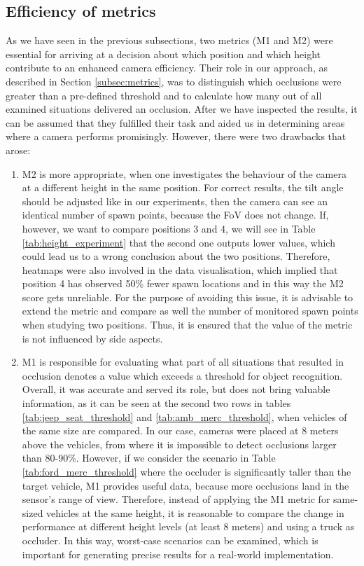 \subsection{Efficiency of metrics}
As we have seen in the previous subsections, two metrics (M1 and M2) were essential for arriving at a decision about which position and which height contribute to an enhanced camera efficiency. Their role in our approach, as described in Section \ref{subsec:metrics}, was to distinguish which occlusions were greater than a pre-defined threshold and to calculate how many out of all examined situations delivered an occlusion. After we have inspected the results, it can be assumed that they fulfilled their task and aided us in determining areas where a camera performs promisingly. However, there were two drawbacks that arose:
\begin{enumerate}
    \item M2 is more appropriate, when one investigates the behaviour of the camera at a different height in the same position. For correct results, the tilt angle should be adjusted like in our experiments, then the camera can see an identical number of spawn points, because the FoV does not change. If, however, we want to compare positions 3 and 4, we will see in Table \ref{tab:height_experiment} that the second one outputs lower values, which could lead us to a wrong conclusion about the two positions. Therefore, heatmaps were also involved in the data visualisation, which implied that position 4 has observed 50\% fewer spawn locations and in this way the M2 score gets unreliable. For the purpose of avoiding this issue, it is advisable to extend the metric and compare as well the number of monitored spawn points when studying two positions. Thus, it is ensured that the value of the metric is not influenced by side aspects.
    \item M1 is responsible for evaluating what part of all situations that resulted in occlusion denotes a value which exceeds a threshold for object recognition. Overall, it was accurate and served its role, but does not bring valuable information, as it can be seen at the second two rows in tables \ref{tab:jeep_seat_threshold} and \ref{tab:amb_merc_threshold}, when vehicles of the same size are compared. In our case, cameras were placed at 8 meters above the vehicles, from where it is impossible to detect occlusions larger than 80-90\%. However, if we consider the scenario in Table \ref{tab:ford_merc_threshold} where the occluder is significantly taller than the target vehicle, M1 provides useful data, because more occlusions land in the sensor's range of view. Therefore, instead of applying the M1 metric for same-sized vehicles at the same height, it is reasonable to compare the change in performance at different height levels (at least 8 meters) and using a truck as occluder. In this way, worst-case scenarios can be examined, which is important for generating precise results for a real-world implementation. 
\end{enumerate}
